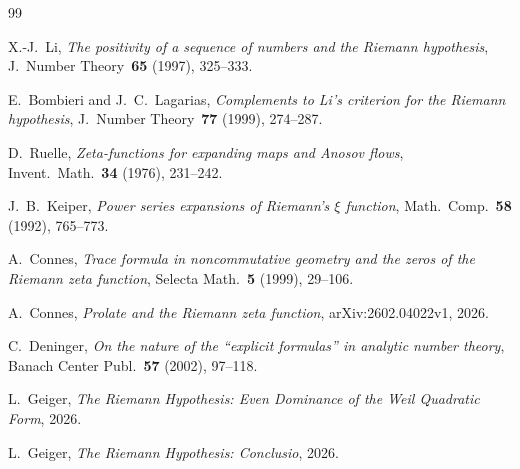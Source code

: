 \documentclass[12pt,a4paper]{article}
\theoremstyle{definition}
\theoremstyle{remark}
\begin{document}
\begin{thebibliography}{99}

X.-J.~Li, \emph{The positivity of a sequence of numbers and the Riemann hypothesis}, J.~Number Theory~\textbf{65} (1997), 325--333.

E.~Bombieri and J.~C.~Lagarias, \emph{Complements to Li's criterion for the Riemann hypothesis}, J.~Number Theory~\textbf{77} (1999), 274--287.

D.~Ruelle, \emph{Zeta-functions for expanding maps and Anosov flows}, Invent.~Math.~\textbf{34} (1976), 231--242.

J.~B.~Keiper, \emph{Power series expansions of Riemann's $\xi$ function}, Math.~Comp.~\textbf{58} (1992), 765--773.

A.~Connes, \emph{Trace formula in noncommutative geometry and the zeros of the Riemann zeta function}, Selecta Math.~\textbf{5} (1999), 29--106.

A.~Connes, \emph{Prolate and the Riemann zeta function}, arXiv:2602.04022v1, 2026.

C.~Deninger, \emph{On the nature of the ``explicit formulas'' in analytic number theory}, Banach Center Publ.~\textbf{57} (2002), 97--118.

L.~Geiger, \emph{The Riemann Hypothesis: Even Dominance of the Weil Quadratic Form}, 2026.

L.~Geiger, \emph{The Riemann Hypothesis: Conclusio}, 2026.

\end{thebibliography}
\end{document}
